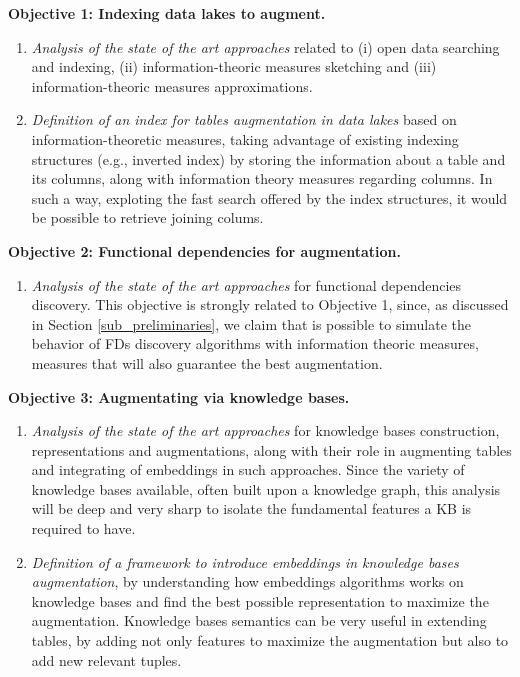 \bigbreak

\noindent\textbf{Objective 1: Indexing data lakes to augment.}
\begin{enumerate}
    \item \textit{Analysis of the state of the art approaches} related to (i) open data searching and indexing, (ii) information-theoric measures sketching and (iii) information-theoric measures approximations.
    \item \textit{Definition of an index for tables augmentation in data lakes} based on information-theoretic measures, taking advantage of existing indexing structures (e.g., inverted index) by storing the information about a table and its columns, along with information theory measures regarding columns. In such a way, exploting the fast search offered by the index structures, it would be possible to retrieve joining colums.
\end{enumerate}

\noindent\textbf{Objective 2: Functional dependencies for augmentation.}
\begin{enumerate}
    \item \textit{Analysis of the state of the art approaches} for functional dependencies discovery. This objective is strongly related to Objective 1, since, as discussed in Section \ref{sub_preliminaries}, we claim that is possible to simulate the behavior of FDs discovery algorithms with information theoric measures, measures that will also guarantee the best augmentation. 
\end{enumerate}

\noindent\textbf{Objective 3: Augmentating via knowledge bases.}
\begin{enumerate}
    \item \textit{Analysis of the state of the art approaches} for knowledge bases construction, representations and augmentations, along with their role in augmenting tables and integrating of embeddings in such approaches. Since the variety of knowledge bases available, often built upon a knowledge graph, this analysis will be deep and very sharp to isolate the fundamental features a KB is required to have.
    \item \textit{Definition of a framework to introduce embeddings in knowledge bases augmentation}, by understanding how embeddings algorithms works on knowledge bases and find the best possible representation to maximize the augmentation. Knowledge bases semantics can be very useful in extending tables, by adding not only features to maximize the augmentation but also to add new relevant tuples.
\end{enumerate}

